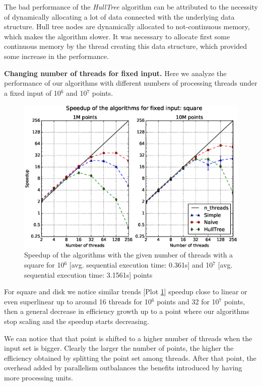 \documentclass[letterpaper]{article}
\newcommand{\mypar}[1]{{\bf #1.}}
\theoremstyle{definition}
\begin{document}
The bad performance of the \textit{HullTree} algorithm can be attributed to the necessity of dynamically allocating a lot of data connected with the underlying data structure.
Hull tree nodes are dynamically allocated to not-continuous memory, which makes the algorithm slower.
It was necessary to allocate first some continuous memory by the thread creating this data structure, which provided some increase in the performance.

\mypar{Changing number of threads for fixed input}
Here we analyze the performance of our algorithms with different numbers of processing threads under a fixed input of 10$^6$ and 10$^7$ points.

\begin{figure}[!ht]\centering
  \includegraphics[scale=0.33]{./plots/speedup_xeon_square_fixed_points.eps}
  \caption{Speedup of the algorithms with the given number of threads with a square for 10$^6$ [avg. sequential execution time: 0.361s] and 10$^7$ [avg. sequential execution time: 3.1561s] points\label{Threads speedup square}}
\end{figure}

For square and disk we notice similar trends [Plot \ref{Threads speedup square}] speedup close to linear or even superlinear up to around 16 threads for 10$^6$ points and 32 for 10$^7$ points, then a general decrease in efficiency growth up to a point where our algorithms stop scaling and the speedup starts decreasing.

We can notice that that point is shifted to a higher number of threads when the input set is bigger.
Clearly the larger the number of points, the higher the efficiency obtained by splitting the point set among threads.
After that point, the overhead added by parallelism outbalances the benefits introduced by having more processing units.
\end{document}
